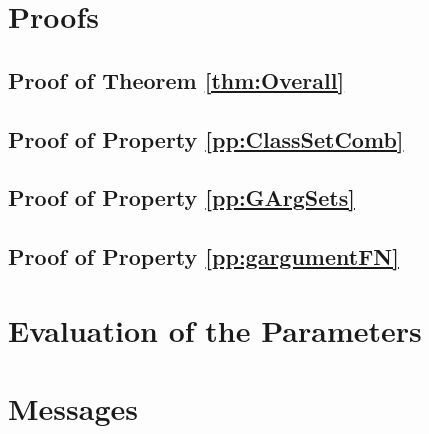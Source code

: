 \documentclass{report}
\begin{document}
\begin{appendices}
\chapter{Proofs}\label{Proofs}
\section{Proof of Theorem \ref{thm:Overall}}\label{proof:ThmOverall}

\section{Proof of Property \ref{pp:ClassSetComb}}\label{proof:ClassSetComp}

\section{Proof of Property \ref{pp:GArgSets}}\label{proof:GArgSets}

\section{Proof of Property \ref{pp:gargumentFN}}\label{proof:FalseNeg}


\chapter{Evaluation of the Parameters}\label{apx:Parameters}


\chapter{Messages}\label{apx:Messages}

\end{appendices}







\pagebreak
\thispagestyle{empty}

\end{document}
